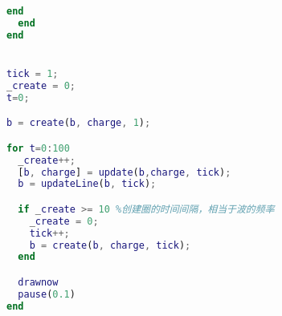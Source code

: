 \begin{lstlisting}[language=matlab]
    end
  end
end


tick = 1;
_create = 0;
t=0;

b = create(b, charge, 1);

for t=0:100
  _create++;
  [b, charge] = update(b,charge, tick);
  b = updateLine(b, tick);

  if _create >= 10 %创建圈的时间间隔，相当于波的频率
    _create = 0;
    tick++;
    b = create(b, charge, tick);
  end

  drawnow
  pause(0.1)
end

\end{lstlisting}
